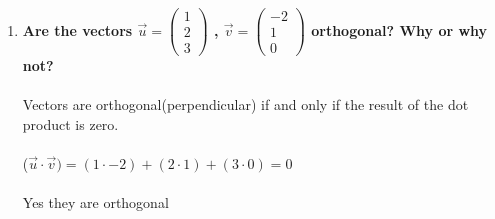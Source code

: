 \documentclass{article}
\begin{document}
\begin{enumerate}[2.]
	\item\textbf{Are the vectors $\vec{u}=\left(\!\begin{array}{c}1 \\ 2 \\  3\end{array} \!\right)$ , $\vec{v}=\left(\!\begin{array}{c}-2 \\ 1 \\  0\end{array} \!\right)$ orthogonal? Why or why not?}\\
	\\
	Vectors are orthogonal(perpendicular) if and only if the result of the dot product is zero.\\
	\\
	($\vec{u}\cdot\vec{v})=(1\cdot-2)+(2\cdot1)+(3\cdot0)=0$
	\\
	\\
	Yes they are orthogonal 
\end{enumerate}
\end{document}
